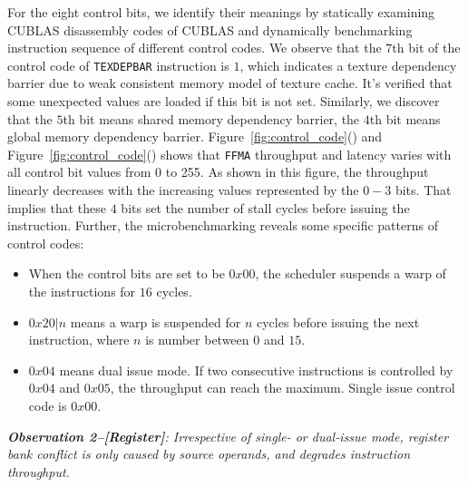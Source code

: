 For the eight control bits, we identify their meanings by statically examining CUBLAS disassembly codes of CUBLAS and dynamically benchmarking instruction sequence of different control codes. We observe that the $7$th bit of the control code of {\tt TEXDEPBAR} instruction is $1$, which
indicates a texture dependency barrier due to weak consistent memory model of texture cache. It's verified that some unexpected values are
loaded if this bit is not set. Similarly, we discover that the $5$th bit means shared memory dependency barrier, the
$4$th bit means global memory dependency barrier. Figure~\ref{fig:control_code}() and Figure~\ref{fig:control_code}() shows that {\tt FFMA} throughput and latency varies with all control bit values from 0 to 255. As shown in this figure, the throughput linearly decreases with the increasing values represented by the $0-3$ bits. That implies that these $4$ bits set the number of stall cycles before issuing the instruction. Further, the microbenchmarking reveals some specific patterns of control codes:

\begin{itemize}
\item When the control bits are set to be $0x00$, the scheduler suspends a warp of the instructions for $16$ cycles.
\item $0x20|n$ means a warp is suspended for $n$ cycles before issuing the next instruction, where $n$ is number between $0$ and $15$.
\item $0x04$ means dual issue mode. If two consecutive instructions is controlled by $0x04$ and $0x05$, the throughput can reach the maximum. Single issue control code is $0x00$.
\end{itemize}


{\em {\bf Observation 2--[Register]}: Irrespective of single- or dual-issue mode, register bank conflict is only caused by source operands, and degrades instruction throughput.}

